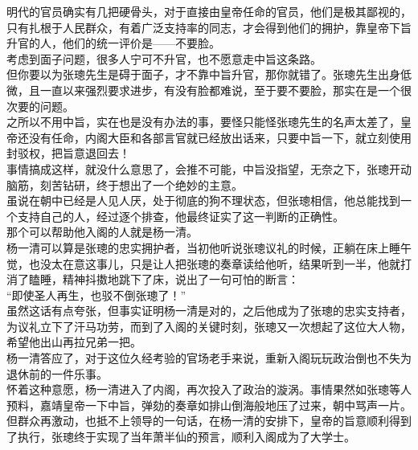 \begin{multicols}{\theparacolNo}
明代的官员确实有几把硬骨头，对于直接由皇帝任命的官员，他们是极其鄙视的，只有扎根于人民群众，有着广泛支持率的同志，才会得到他们的拥护，靠皇帝下旨升官的人，他们的统一评价是——不要脸。\\

考虑到面子问题，很多人宁可不升官，也不愿意走中旨这条路。\\

但你要以为张璁先生是碍于面子，才不靠中旨升官，那你就错了。张璁先生出身低微，且一直以来强烈要求进步，有没有脸都难说，至于要不要脸，那实在是一个很次要的问题。\\

之所以不用中旨，实在也是没有办法的事，要怪只能怪张璁先生的名声太差了，皇帝还没有任命，内阁大臣和各部言官就已经放出话来，只要中旨一下，就立刻使用封驳权，把旨意退回去！\\

事情搞成这样，就没什么意思了，会推不可能，中旨没指望，无奈之下，张璁开动脑筋，刻苦钻研，终于想出了一个绝妙的主意。\\

虽说在朝中已经是人见人厌，处于彻底的狗不理状态，但张璁相信，他总能找到一个支持自己的人，经过逐个排查，他最终证实了这一判断的正确性。\\

那个可以帮助他入阁的人就是杨一清。\\

杨一清可以算是张璁的忠实拥护者，当初他听说张璁议礼的时候，正躺在床上睡午觉，也没太在意这事儿，只是让人把张璁的奏章读给他听，结果听到一半，他就打消了瞌睡，精神抖擞地跳下了床，说出了一句可怕的断言：\\

“即使圣人再生，也驳不倒张璁了！”\\

虽然这话有点夸张，但事实证明杨一清是对的，之后他成为了张璁的忠实支持者，为议礼立下了汗马功劳，而到了入阁的关键时刻，张璁又一次想起了这位大人物，希望他出山再拉兄弟一把。\\

杨一清答应了，对于这位久经考验的官场老手来说，重新入阁玩玩政治倒也不失为退休前的一件乐事。\\

怀着这种意愿，杨一清进入了内阁，再次投入了政治的漩涡。事情果然如张璁等人预料，嘉靖皇帝一下中旨，弹劾的奏章如排山倒海般地压了过来，朝中骂声一片。\\

但群众再激动，也抵不上领导的一句话，在杨一清的安排下，皇帝的旨意顺利得到了执行，张璁终于实现了当年萧半仙的预言，顺利入阁成为了大学士。\\


\end{multicols}
